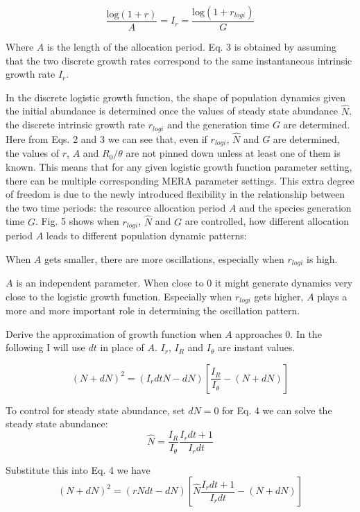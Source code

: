 \documentclass[12pt]{article}
\begin{document}
\begin{equation}
 \frac{ \mbox{log} (1+r) }{A} = I_r = \frac{ \mbox{log} (1+r_{logi}) }{G}
\end{equation}

Where $A$ is the length of the allocation period. Eq. 3 is obtained by assuming that the two discrete growth rates correspond to the same instantaneous intrinsic growth rate $I_r$. 

In the discrete logistic growth function, the shape of population dynamics given the initial abundance is determined once the values of steady state abundance $\hat{N}$, the discrete intrinsic growth rate $r_{logi}$ and the generation time $G$ are determined. Here from Eqs. 2 and 3 we can see that, even if $r_{logi}$, $\hat{N}$ and $G$ are determined, the values of $r$, $A$ and $R_0/\theta$ are not pinned down unless at least one of them is known. This means that for any given logistic growth function parameter setting, there can be multiple corresponding MERA parameter settings. This extra degree of freedom is due to the newly introduced flexibility in the relationship between the two time periods: the resource allocation period $A$ and the species generation time $G$. Fig. 5 shows when $r_{logi}$, $\hat{N}$ and $G$ are controlled, how different allocation period $A$ leads to different population dynamic patterns:


When $A$ gets smaller, there are more oscillations, especially when $r_{logi}$ is high. 

$A$ is an independent parameter. When close to 0 it might generate dynamics very close to the logistic growth function. Especially when $r_{logi}$ gets higher, $A$ plays a more and more important role in determining the oscillation pattern.

Derive the approximation of growth function when $A$ approaches 0. In the following I will use $dt$ in place of $A$. $I_r$, $I_R$ and $I_\theta$ are instant values.

\begin{equation}
(N + dN)^2 = (I_r dt N  - dN) [\frac{I_R}{I_\theta} - (N+dN)]
\end{equation}

To control for steady state abundance, set $dN=0$ for Eq. 4 we can solve the steady state abundance: 
\begin{equation}
\hat{N} = \frac{I_R}{I_\theta} \frac{I_r dt+1}{I_r dt} 
\end{equation}

Substitute this into Eq. 4 we have
\begin{equation}
(N + dN)^2 = (rN dt - dN) [\hat{N} \frac{I_r dt+1}{I_r dt} - (N+dN)]
\end{equation}
\end{document}
